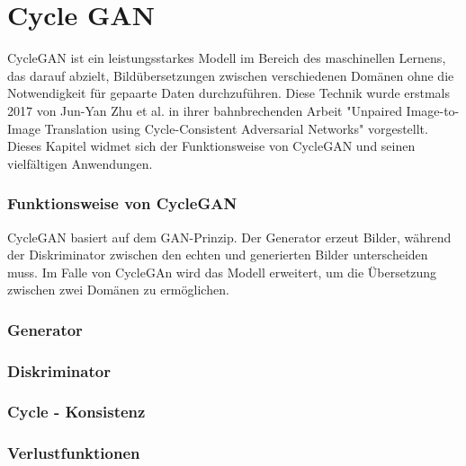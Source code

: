 \chapter*{Cycle GAN}

CycleGAN ist ein leistungsstarkes Modell im Bereich des maschinellen Lernens, das darauf abzielt, Bildübersetzungen zwischen verschiedenen Domänen ohne die Notwendigkeit für gepaarte Daten durchzuführen. Diese Technik wurde erstmals 2017 von Jun-Yan Zhu et al. in ihrer bahnbrechenden Arbeit "Unpaired Image-to-Image Translation using Cycle-Consistent Adversarial Networks" vorgestellt. Dieses Kapitel widmet sich der Funktionsweise von CycleGAN und seinen vielfältigen Anwendungen.

\subsection*{Funktionsweise von CycleGAN}

CycleGAN basiert auf dem GAN-Prinzip. Der Generator erzeut Bilder, während der Diskriminator zwischen den echten und generierten Bilder unterscheiden muss. Im Falle von CycleGAn wird das Modell erweitert, um die Übersetzung zwischen zwei Domänen zu ermöglichen.

\subsection*{Generator}

\subsection*{Diskriminator}

\subsection*{Cycle - Konsistenz}

\subsection*{Verlustfunktionen}
